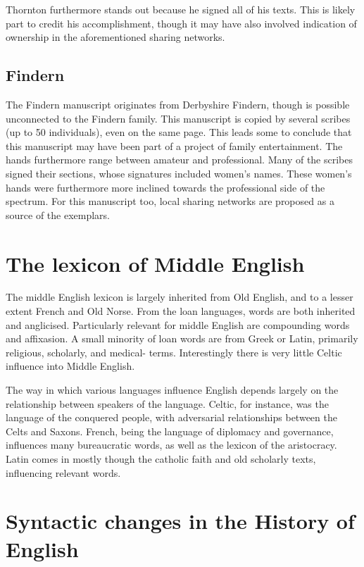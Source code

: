 \documentclass[12pt]{report}
\begin{document}
Thornton furthermore stands out because he signed all of his texts. This is
likely part to credit his accomplishment, though it may have also involved
indication of ownership in the aforementioned sharing networks.

\section{Findern} The Findern manuscript originates from Derbyshire Findern,
though is possible unconnected to the Findern family. This manuscript is copied
by several scribes (up to 50 individuals), even on the same page. This leads
some to conclude that this manuscript may have been part of a project of family
entertainment. The hands furthermore range between amateur and professional.
Many of the scribes signed their sections, whose signatures included women's
names. These women's hands were furthermore more inclined towards the
professional side of the spectrum. For this manuscript too, local sharing
networks are proposed as a source of the exemplars.

\chapter{The lexicon of Middle English}

The middle English lexicon is largely inherited from Old English, and to a
lesser extent French and Old Norse. From the loan languages, words are both
inherited and anglicised. Particularly relevant for middle English are
compounding words and affixasion. A small minority of loan words are from Greek
or Latin, primarily religious, scholarly, and medical- terms. Interestingly
there is very little Celtic influence into Middle English.

The way in which various languages influence English depends largely on the
relationship between speakers of the language. Celtic, for instance, was the
language of the conquered people, with adversarial relationships between the
Celts and Saxons. French, being the language of diplomacy and governance,
influences many bureaucratic words, as well as the lexicon of the aristocracy.
Latin comes in mostly though the catholic faith and old scholarly texts,
influencing relevant words.

\chapter{Syntactic changes in the History of English}
\end{document}
